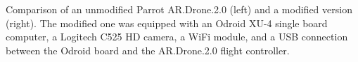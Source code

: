 Comparison of an unmodified Parrot AR.Drone.2.0 (left) and a
    modified version (right). The modified one was equipped with an
    Odroid XU-4 single board computer, a Logitech C525 HD camera, a
    WiFi module, and a USB connection between the Odroid board and the
    AR.Drone.2.0 flight controller.